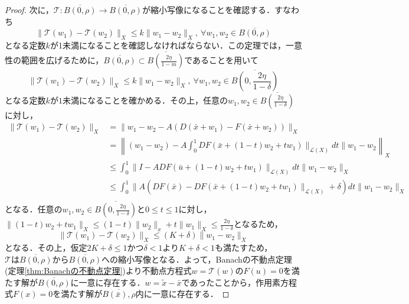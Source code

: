 \begin{proof}
  次に，$\mathcal{T}:\overline{B(0,\rho)}\rightarrow \overline{B(0,\rho)}$が縮小写像になることを確認する．すなわち
  \begin{equation*}
    \|\mathcal{T}(w_1) - \mathcal{T} (w_2)\|_X \leq k \|w_1-w_2\|_X,\ \forall w_1,w_2\in \overline{B(0,\rho)}
  \end{equation*}
  となる定数$k$が1未満になることを確認しなければならない．この定理では，一意性の範囲を広げるために，$\overline{B(0,\rho)}\subset \overline{B\left(\frac{2\eta}{1-m}\right)}$であることを用いて
  \begin{equation*}
    \|\mathcal{T}(w_1) - \mathcal{T} (w_2)\|_X \leq k \|w_1-w_2\|_X,\ \forall w_1,w_2\in \overline{B\left(0,\frac{2\eta}{1-\delta}\right)}
  \end{equation*}
  となる定数$k$が$1$未満になることを確かめる．その上，任意の$w_1,w_2\in\overline{B\left(\frac{2\eta}{1-\delta}\right)}$に対し，
  \begin{align*}
    \|\mathcal{T}(w_1) - \mathcal{T} (w_2)\|_X & = \|w_1-w_2-A(D(\bar{x}+w_1)-F(\bar{x}+w_2))\|_X                                                         \\
                                               & = \left\| (w_1-w_2)-A\int_{0}^{1}DF(\bar{x}+(1-t)w_2+tw_1)\|_{\mathcal{L}(X)}dt\|w_1-w_2 \right\|_X                \\
                                               & \leq \int_{0}^{1} \|I-ADF(\bar{u}+(1-t)w_2+tw_1)\|_{\mathcal{L}(X)}dt\|w_1-w_2\|_X                    \\
                                               & \leq \int_{0}^{1} \|A(DF(\bar{x})-DF(\bar{x}+(1-t)w_2+tw_1)\|_{\mathcal{L}(X)}+\delta)dt\|w_1-w_2\|_X \\
  \end{align*}
  となる．任意の$w_1,w_2\in\overline{B\left(0,\frac{2\eta}{1-\delta}\right)}$と$0\leq t \leq 1$に対し，$\|(1-t)w_2+tw_1\|_X\leq(1-t)\|w_2\|_x+t\|w_1\|_X\leq \frac{2\eta}{1-\delta}$となるため，
  \begin{equation*}
    \|\mathcal{T}(w_1) - \mathcal{T} (w_2)\|_X \leq (K+\delta)\|w_1-w_2\|_X
  \end{equation*}
  となる．その上，仮定$2K+\delta\leq 1かつ\delta<1$より$K+\delta < 1$も満たすため，$\mathcal{T}は\overline{B(0,\rho)}から\overline{B(0,\rho)}$への縮小写像となる．よって，Banachの不動点定理(定理\ref{thm:Banachの不動点定理})より不動点方程式$w=\mathcal{T}(w)$の$F(u)=0$を満たす解が$\overline{B(0,\rho)}$に一意に存在する．$w=\tilde{x}-\bar{x}$であったことから，作用素方程式$F(x)=0$を満たす解が$\overline{B(\bar{x}),\rho}$内に一意に存在する．


\end{proof}
